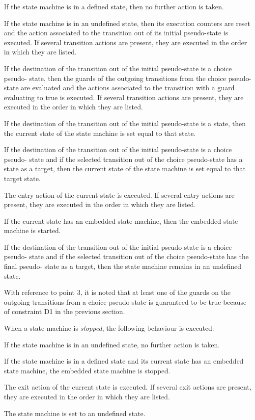 \documentclass[a4paper,10pt]{article}
\newenvironment{fw_enumerate}					%
{\begin{enumerate}
  \setlength{\itemsep}{1mm}
  \setlength{\parskip}{0pt}
  \setlength{\parsep}{0pt}}
{\end{enumerate}}
\begin{document}
\begin{fw_enumerate}
\item If the state machine is in a defined state, then no further action is taken.
\item If the state machine is in an undefined state, then its execution counters are reset
and the action associated to the transition
out of its initial pseudo-state is executed. If several transition actions are present, they
are executed in the order in which they are listed.
\item If the destination of the transition out of the initial pseudo-state is a choice pseudo-
state, then the guards of the outgoing transitions from the choice pseudo-state are
evaluated and the actions associated to the transition with a guard evaluating to true is
executed. If several transition actions are present, they are executed in the order in
which they are listed.
\item If the destination of the transition out of the initial pseudo-state is a state, then the
current state of the state machine is set equal to that state.
\item If the destination of the transition out of the initial pseudo-state is a choice pseudo-
state and if the selected transition out of the choice pseudo-state has a state as a target,
then the current state of the state machine is set equal to that target state.
\item The entry action of the current state is executed. If several entry actions are present,
they are executed in the order in which they are listed.
\item If the current state has an embedded state machine, then the embedded state machine is
started.
\item If the destination of the transition out of the initial pseudo-state is a choice pseudo-
state and if the selected transition out of the choice pseudo-state has the final pseudo-
state as a target, then the state machine remains in an undefined state.
\end{fw_enumerate}

With reference to point 3, it is noted that at least one of the guards on the outgoing transitions
from a choice pseudo-state is guaranteed to be true because of constraint D1 in the previous
section.

When a state machine is \emph{stopped}, the following behaviour is executed:
\begin{fw_enumerate}
\item If the state machine is in an undefined state, no further action is taken.
\item If the state machine is in a defined state and its current state has an embedded state
machine, the embedded state machine is stopped.
\item The exit action of the current state is executed. If several exit actions are present, they
are executed in the order in which they are listed.
\item The state machine is set to an undefined state.
\end{fw_enumerate}
\end{document}
